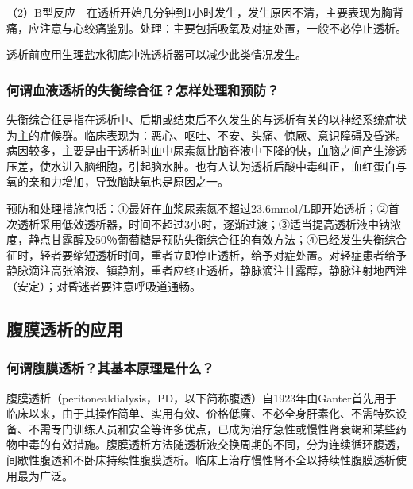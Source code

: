 （2）B型反应　在透析开始几分钟到1小时发生，发生原因不清，主要表现为胸背痛，应注意与心绞痛鉴别。处理：主要包括吸氧及对症处置，一般不必停止透析。

透析前应用生理盐水彻底冲洗透析器可以减少此类情况发生。

\subsubsection{何谓血液透析的失衡综合征？怎样处理和预防？}

失衡综合征是指在透析中、后期或结束后不久发生的与透析有关的以神经系统症状为主的症候群。临床表现为：恶心、呕吐、不安、头痛、惊厥、意识障碍及昏迷。病因较多，主要是由于透析时血中尿素氮比脑脊液中下降的快，血脑之间产生渗透压差，使水进入脑细胞，引起脑水肿。也有人认为透析后酸中毒纠正，血红蛋白与氧的亲和力增加，导致脑缺氧也是原因之一。

预防和处理措施包括：①最好在血浆尿素氮不超过23.6mmol/L即开始透析；②首次透析采用低效透析器，时间不超过3小时，逐渐过渡；③适当提高透析液中钠浓度，静点甘露醇及50％葡萄糖是预防失衡综合征的有效方法；④已经发生失衡综合征时，轻者要缩短透析时间，重者立即停止透析，给予对症处置。对轻症患者给予静脉滴注高张溶液、镇静剂，重者应终止透析，静脉滴注甘露醇，静脉注射地西泮（安定）；对昏迷者要注意呼吸道通畅。

\subsection{腹膜透析的应用}

\subsubsection{何谓腹膜透析？其基本原理是什么？}

腹膜透析（peritonealdialysis，PD，以下简称腹透）自1923年由Ganter首先用于临床以来，由于其操作简单、实用有效、价格低廉、不必全身肝素化、不需特殊设备、不需专门训练人员和安全等许多优点，已成为治疗急性或慢性肾衰竭和某些药物中毒的有效措施。腹膜透析方法随透析液交换周期的不同，分为连续循环腹透，间歇性腹透和不卧床持续性腹膜透析。临床上治疗慢性肾不全以持续性腹膜透析使用最为广泛。

